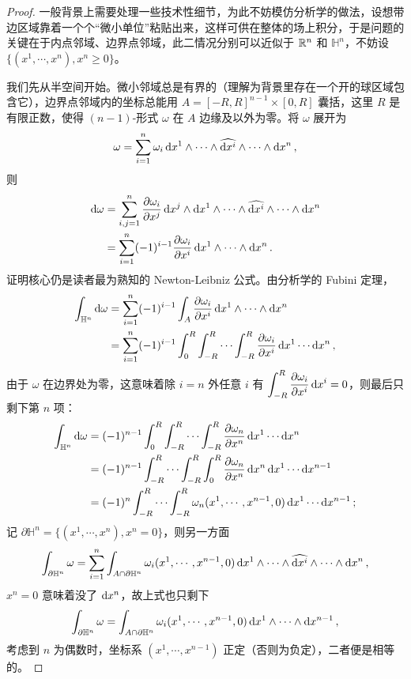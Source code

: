 \begin{proof}
    一般背景上需要处理一些技术性细节，为此不妨模仿分析学的做法，设想带边区域靠着一个个“微小单位”粘贴出来，这样可供在整体的场上积分，于是问题的关键在于内点邻域、边界点邻域，此二情况分别可以近似于 $\mathbb{R}^n$ 和 $\mathbb H^{n}$，不妨设 $\{(x^1,\cdots,x^n),x^n\geqslant 0\}$。
    
    我们先从半空间开始。微小邻域总是有界的（理解为背景里存在一个开的球区域包含它），边界点邻域内的坐标总能用 $A=[-R,R]^{n-1}\times[0,R]$ 囊括，这里 $R$ 是有限正数，使得 $(n-1)$-形式 $\omega$ 在 $A$ 边缘及以外为零。将 $\omega$ 展开为
    \[
    \omega=\sum_{i=1}^n\omega_i \dd{x^1}\wedge \cdots \wedge \widehat{\dd{x^i}}\wedge \cdots \wedge \dd{x^n},
    \]
    则
    \begin{align*}
        \dd\omega&=\sum_{i,j=1}^n\pdv{\omega_i}{x^j}\dd{x^j}\wedge \dd{x^1}\wedge \cdots \wedge \widehat{\dd{x^i}}\wedge \cdots \wedge \dd{x^n}\\
        &=\sum_{i=1}^n(-1)^{i-1}\pdv{\omega_i}{x^i}\dd{x^1}\wedge \cdots \wedge \dd{x^n}.
    \end{align*}
    证明核心仍是读者最为熟知的 Newton-Leibniz 公式。由分析学的 Fubini 定理，
    \begin{align*}
        \int_{\mathbb H^{n}}\dd\omega&=\sum_{i=1}^n(-1)^{i-1}\int_A\pdv{\omega_i}{x^i}\dd{x^1}\wedge \cdots \wedge \dd{x^n}\\
        &=\sum_{i=1}^n(-1)^{i-1}\int_0^R\int_{-R}^{R}\cdots\int_{-R}^{R}\pdv{\omega_i}{x^i}\dd{x^1}\cdots \dd{x^n},
    \end{align*}
    由于 $\omega$ 在边界处为零，这意味着除 $i=n$ 外任意 $i$ 有 $\displaystyle\int_{-R}^{R}\pdv{\omega_i}{x^i}\dd{x^i}=0$，则最后只剩下第 $n$ 项：
    \begin{align*}
        \int_{\mathbb H^{n}}\dd\omega&=(-1)^{n-1}\int_0^R\int_{-R}^{R}\cdots\int_{-R}^{R}\pdv{\omega_n}{x^n}\dd{x^1}\cdots \dd{x^{n}}\\
        &=(-1)^{n-1}\int_{-R}^{R}\cdots\int_{-R}^{R}\int_0^R\pdv{\omega_n}{x^n}\dd{x^n}\dd{x^1}\cdots \dd{x^{n-1}}\\
        &=(-1)^{n}\int_{-R}^{R}\cdots\int_{-R}^{R}\omega_n(x^1,\cdots,x^{n-1},0)\dd{x^1}\cdots \dd{x^{n-1}};
    \end{align*}
    记 $\partial\mathbb H^{n}=\{(x^1,\cdots,x^n),x^n=0\}$，则另一方面
    \[
    \int_{\partial\mathbb H^{n}}\omega=\sum_{i=1}^n\int_{A\cap\partial\mathbb H^{n}} \omega_i(x^1,\cdots,x^{n-1},0)\dd{x^1}\wedge \cdots \wedge \widehat{\dd{x^i}}\wedge \cdots \wedge \dd{x^n},
    \]
    $x^n=0$ 意味着没了 $\dd{x^n}$，故上式也只剩下
    \[
    \int_{\partial\mathbb H^{n}}\omega=\int_{A\cap\partial\mathbb H^{n}} \omega_i(x^1,\cdots,x^{n-1},0)\dd{x^1}\wedge \cdots \wedge \dd{x^{n-1}},
    \]
    考虑到 $n$ 为偶数时，坐标系 $(x^1,\cdots,x^{n-1})$ 正定（否则为负定），二者便是相等的。


\end{proof}
